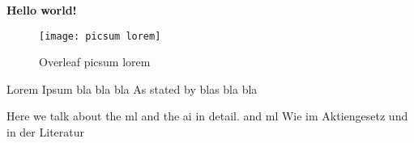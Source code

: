 \documentclass[../main.tex]{subfiles}
\begin{document}
\textbf{Hello world!}

\begin{figure}[bh]
\centering
\texttt{[image: picsum lorem]}

\label{fig:picsum lorem}
\caption{Overleaf picsum lorem}
\end{figure}

Lorem Ipsum bla\autocite{moews_kosten-_2002} bla bla As stated by 
blas bla bla 

Here we talk about the \gls{ml} and the \gls{ai} in detail. and \gls{ml}
Wie im Aktiengesetz \autocite{aktg1965} und in der Literatur
\end{document}
